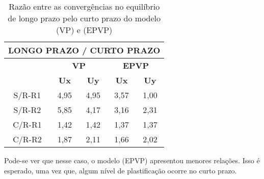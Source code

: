 \begin{table}[H]
	\caption{Razão entre as convergências no equilíbrio de longo prazo pelo curto prazo do modelo (VP) e (EPVP)}
	\label{convergencias_analise_secao_eliptica_2}
	\centering
	\small
	\renewcommand{\arraystretch}{1.25}
	\begin{tabular}{c c c c c}
		\hline
		\multicolumn{5}{c}{\textbf{LONGO PRAZO / CURTO PRAZO}}\\	
		\hline
		\multicolumn{1}{c}{} &
		\multicolumn{2}{c}{\textbf{VP}} &
		\multicolumn{2}{c}{\textbf{EPVP}}	\\
		\multicolumn{1}{c}{} &
		\multicolumn{1}{c}{\textbf{Ux}} &
		\multicolumn{1}{c}{\textbf{Uy}} &
		\multicolumn{1}{c}{\textbf{Ux}} &
		\multicolumn{1}{c}{\textbf{Uy}} \\
		\hline
		S/R-R1	 &	4,95 &	4,95 &	3,57 &	1,00 \\
		S/R-R2	 &	5,85 &	4,17 &	3,16 &	2,31 \\
		C/R-R1	 &	1,42 &	1,42 &	1,37 &	1,37 \\
		C/R-R2	 &	1,87 &	2,11 &	1,66 &	2,02 \\
		\hline
	\end{tabular}
	\normalsize
\end{table}

Pode-se ver que nesse caso, o modelo (EPVP) apresentou menores relações. Isso é esperado, uma vez que, algum nível de plastificação ocorre no curto prazo.




